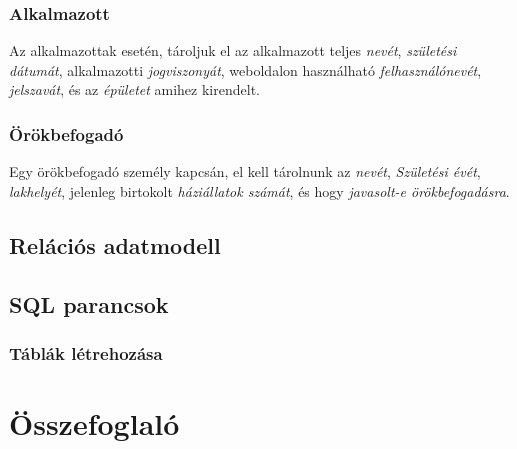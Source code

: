 \documentclass[a4paper,12pt]{article}
\begin{document}
\subsubsection*{Alkalmazott}
Az alkalmazottak esetén, tároljuk el az alkalmazott teljes \textit{nevét}, \textit{születési dátumát}, alkalmazotti \textit{jogviszonyát}, weboldalon használható \textit{felhasználónevét}, \textit{jelszavát}, és az \textit{épületet} amihez kirendelt.
\subsubsection*{Örökbefogadó}
Egy örökbefogadó személy kapcsán, el kell tárolnunk az \textit{nevét}, \textit{Születési évét}, \textit{lakhelyét}, jelenleg birtokolt \textit{háziállatok számát},  és hogy \textit{javasolt-e örökbefogadásra}.

\subsection{Relációs adatmodell}
\subsection{SQL parancsok}
\subsubsection{Táblák létrehozása}
\section{Összefoglaló}
\end{document}
